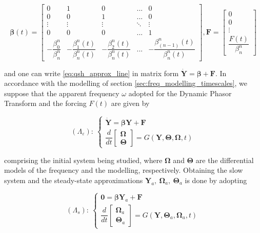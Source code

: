 \begin{equation} \boldsymbol{\beta}(t) =
\left[\begin{array}{ccccc} 0 & 1 & 0 & ... & 0 \\[3mm] 0 & 0 & 1 & ... & 0  \\[3mm] \vdots & \vdots & \vdots & \ddots & \vdots \\[3mm] 0 & 0 & 0 & ... & 1 \\[3mm] - \dfrac{\beta^n_0}{\beta^n_n} & - \dfrac{\beta^n_1(t)}{\beta^n_n(t)} & -\dfrac{\beta^n_2(t)}{\beta^n_n(t)} & ... & -\dfrac{\beta^n_{(n-1)}(t)}{\beta^n_n(t)}
\end{array}\right] ,
%
\mathbf{F} = \left[\begin{array}{c} 0 \\[3mm] 0 \\[3mm] \vdots \\[3mm] \dfrac{F(t)}{\beta_n^n} \end{array}\right]
\end{equation}

	\noindent and one can write \eqref{eq:qsh_approx_line} in matrix form $\dot{\mathbf{Y}} = \boldsymbol{\beta} + \mathbf{F}$. In accordance with the modelling of section \ref{sec:freq_modelling_timescales}, we suppose that the apparent frequency $\omega$ adopted for the Dynamic Phasor Transform and the forcing $F(t)$ are given by

\begin{equation}
	\left(\Lambda_\varepsilon\right):\ \left\{\begin{array}{l} 
		\dot{\mathbf{Y}} = \boldsymbol{\beta}\mathbf{Y} + \mathbf{F} \\[3mm]
		\dfrac{d}{dt}\left[\begin{array}{c} \boldsymbol{\Omega} \\[3mm] \boldsymbol{\Theta}\end{array}\right] = G \left(\mathbf{Y}, \boldsymbol{\Theta}, \boldsymbol{\Omega}, t\right)
\end{array} \right.
\end{equation}

	\noindent comprising the initial system being studied, where $\boldsymbol{\Omega}$ and $\boldsymbol{\Theta}$ are the differential models of the frequency and the modelling, respectively. Obtaining the slow system and the steady-state approximations $\mathbf{Y}_a,\ \boldsymbol{\Omega}_a,\ \boldsymbol{\Theta}_a$ is done by adopting

\begin{equation}
	\left(\Lambda_s\right):\ \left\{\begin{array}{l} 
		\mathbf{0} = \boldsymbol{\beta}\mathbf{Y}_a + \mathbf{F} \\[3mm]
		\dfrac{d}{dt}\left[\begin{array}{c} \boldsymbol{\Omega}_a \\[3mm] \boldsymbol{\Theta}_a \end{array}\right] = G \left(\mathbf{Y}, \boldsymbol{\Theta}_a, \boldsymbol{\Omega}_a, t\right)
\end{array} \right.
\end{equation}

